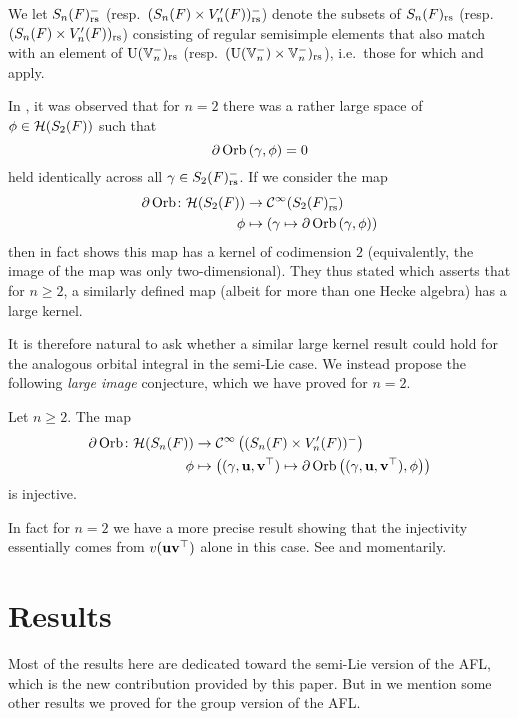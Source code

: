 We let $S_n(F)_{\mathrm{rs}}^-$ (resp.\ $(S_n(F) \times V'_n(F))_{\mathrm{rs}}^-$)
denote the subsets of $S_n(F)_{\mathrm{rs}}$ (resp.\ $(S_n(F) \times V'_n(F))_{\mathrm{rs}}$)
consisting of regular semisimple elements that also match with an element of
$\operatorname{U}(\mathbb V_n^-)_{\mathrm{rs}}$ (resp.\ $(\operatorname{U}(\mathbb V_n^-) \times \mathbb V_n^-)_{\mathrm{rs}}$),
i.e.\ those for which 
and  apply.

In \cite{ref:AFLspherical}, it was observed that for $n = 2$
there was a rather large space of $\phi \in \mathcal H(S_2(F))$ such that
\[ \partial \operatorname{Orb} \left(\gamma, \phi \right) = 0 \]
held identically across all $\gamma \in S_2(F)_{\mathrm{rs}}^-$.
If we consider the map
\begin{align*}
  \partial\operatorname{Orb} \colon \mathcal H(S_2(F)) &\to \mathcal{C}^\infty(S_2(F)_{\mathrm{rs}}^-) \\
  \phi &\mapsto \left( \gamma \mapsto \partial \operatorname{Orb} \left(\gamma, \phi \right) \right)
\end{align*}
then \cite[Theorem 8.2.3]{ref:AFLspherical} in fact
shows this map has a kernel of codimension $2$
(equivalently, the image of the map was only two-dimensional).
They thus stated \cite[Conjecture 1.0.2]{ref:AFLspherical} which asserts that for $n \ge 2$,
a similarly defined map (albeit for more than one Hecke algebra) has a large kernel.

It is therefore natural to ask whether a similar large kernel result
could hold for the analogous orbital integral in the semi-Lie case.
We instead propose the following \emph{large image} conjecture,
which we have proved for $n = 2$.
\begin{conjecture}
  \label{conj:kernel_semi_lie}
  Let $n \ge 2$.
  The map
  \begin{align*}
    \partial\operatorname{Orb} \colon \mathcal H(S_n(F)) &\to \mathcal{C}^\infty\left( (S_n(F) \times V'_n(F))^- \right) \\
    \phi &\mapsto \left( {(\gamma, \mathbf u, \mathbf v^\top)} \mapsto \partial \operatorname{Orb} \left({(\gamma, \mathbf u, \mathbf v^\top)}, \phi \right) \right)
  \end{align*}
  is injective.
\end{conjecture}
In fact for $n=2$ we have a more precise result
showing that the injectivity essentially comes from $v(\mathbf u\mathbf v^\top)$ alone in this case.
See  and  momentarily.

\section{Results}
Most of the results here are dedicated toward the semi-Lie version of the AFL,
which is the new contribution provided by this paper.
But in  we mention some other results
we proved for the group version of the AFL.

